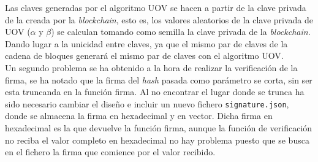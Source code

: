 Las claves generadas por el algoritmo UOV se hacen a partir de la clave privada de la creada por la \textit{blockchain}, esto es, los valores aleatorios de la clave privada de UOV ($\alpha$ y $\beta$) se calculan tomando como semilla la clave privada de la \textit{blockchain}. Dando lugar a la unicidad entre claves, ya que el mismo par de claves de la cadena de bloques generará el mismo par de claves con el algoritmo UOV.\\

Un segundo problema se ha obtenido a la hora de realizar la verificación de la firma, se ha notado que la firma del \textit{hash} pasada como parámetro se corta, sin ser esta truncanda en la función firma. Al no encontrar el lugar donde se trunca ha sido necesario cambiar el diseño e incluir un nuevo fichero \texttt{signature.json}, donde se almacena la firma en hexadecimal y en vector. Dicha firma en hexadecimal es la que devuelve la función firma, aunque la función de verificación no reciba el valor completo en hexadecimal no hay problema puesto que se busca en el fichero la firma que comience por el valor recibido. %

